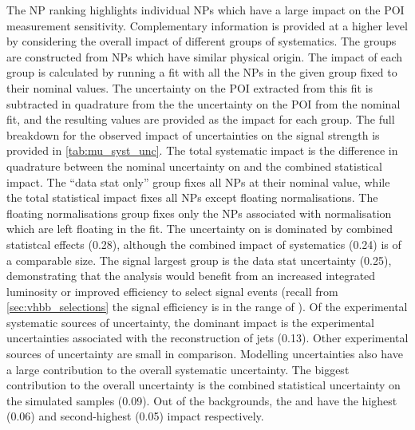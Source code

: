 The NP ranking highlights individual NPs which have a large impact on the POI measurement sensitivity.
Complementary information is provided at a higher level by considering the overall impact of different groups of systematics.
The groups are constructed from NPs which have similar physical origin.
The impact of each group is calculated by running a fit with all the NPs in the given group fixed to their nominal values.
The uncertainty on the POI extracted from this fit is subtracted in quadrature from the the uncertainty on the POI from the nominal fit, and the resulting values are provided as the impact for each group.
The full breakdown for the observed impact of uncertainties on the \muVH signal strength is provided in \cref{tab:mu_syst_unc}.
The total systematic impact is the difference in quadrature between the nominal uncertainty on \muVH and the combined statistical impact.
The ``data stat only'' group fixes all NPs at their nominal value, while the total statistical impact fixes all NPs except floating normalisations.
The floating normalisations group fixes only the NPs associated with normalisation which are left floating in the fit.
The uncertainty on \muVH is dominated by combined statistcal effects (0.28), although the combined impact of systematics (0.24) is of a comparable size.
The signal largest group is the data stat uncertainty (0.25), demonstrating that the analysis would benefit from an increased integrated luminosity or improved efficiency to select signal events (recall from \cref{sec:vhbb_selections} the signal efficiency is in the range of ).
Of the experimental systematic sources of uncertainty, the dominant impact is the experimental uncertainties associated with the reconstruction of \largeR jets (0.13).
Other experimental sources of uncertainty are small in comparison.
Modelling uncertainties also have a large contribution to the overall systematic uncertainty.
The biggest contribution to the overall uncertainty is the combined statistical uncertainty on the simulated samples (0.09).
Out of the backgrounds, the \Wjets and \Zjets have the highest (0.06) and second-highest (0.05) impact respectively.




